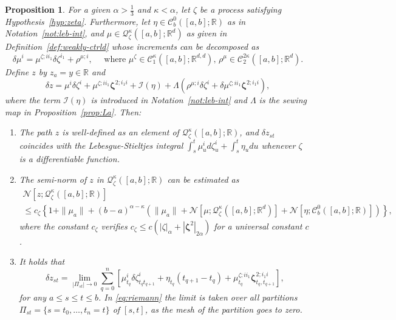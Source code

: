 \documentclass[12pt,reqno]{amsart}
\numberwithin{equation}{section}  %
\newcommand{\der}{\delta}
\newcommand{\1}{{\bf 1}}
\newcommand{\2}{{\bf 2}}
\newcommand{\R}{\mathbb R}
\newcommand{\cac}{\mathcal C}
\newcommand{\ci}{\mathcal I}
\newcommand{\cn}{\mathcal N}
\newcommand{\cq}{\mathcal Q}
\newcommand{\al}{\alpha}
\newcommand{\ka}{\kappa}
\newcommand{\laa}{\Lambda}
\newcommand{\lp}{\left(}
\newcommand{\rp}{\right)}
\newcommand{\lc}{\left[}
\newcommand{\rc}{\right]}
\newcommand{\lcl}{\left\{}
\newcommand{\rcl}{\right\}}
\newtheorem{proposition}[theorem]{Proposition}
\theoremstyle{remark}
\theoremstyle{remark}
\newcommand{\beq}{\begin{equation}}
\newcommand{\eeq}{\end{equation}}
\begin{document}
\begin{proposition}\label{prop:integral_as_weak}
For a given $\al > \frac{1}{3}$ and $\ka < \al$, let $\zeta$ be a process satisfying Hypothesis~\ref{hyp:zeta}. Furthermore, let $\eta \in \cac_b^0([a,b]; \R)$ as in Notation~\ref{not:leb-int}, and $\mu \in \cq_{\zeta}^{\ka}([a,b]; \R^d)$ as given in Definition~\ref{def:weakly-ctrld} whose increments can be decomposed as
\beq\label{b1}
\der \mu^i = \mu^{\zeta;i i_1} \der \zeta^{i_1} + \rho^{\mu;i}, \quad\text{ where } \mu^{\zeta} \in \cac_1^{\ka}([a,b]; \R^{d,d}), \, \rho^{\mu} \in \cac_2^{2\ka}([a,b]; \R^d).
\eeq
Define $z$ by $z_a = y \in \R$ and 
\beq\label{eq:b}
\der z = \mu^i\der \zeta^i + \mu^{\zeta;i i_1} \mathbf{\zeta}^{2;i_1 i} + \ci(\eta) + \Lambda(\rho^{\mu;i} \der \zeta^i + \der \mu^{\zeta;i i_1} \mathbf{\zeta}^{2; i_1 i}),
\eeq
where the term $\ci(\eta)$ is introduced in Notation~\ref{not:leb-int} and $\laa$ is the sewing map in Proposition~\ref{prop:La}. Then:
\begin{enumerate}[wide, labelwidth=!, labelindent=0pt, label=\textnormal{(\arabic*)}]
\setlength\itemsep{.05in}

\item 
 The path $z$ is well-defined as an element of $\cq_{\zeta}^{\ka}([a,b]; \R)$, and $\der z_{st}$ coincides with the Lebesgue-Stieltjes integral $\int_s^t \mu_u^i d\zeta_u^i + \int_s^t \eta_u du$  whenever $\zeta$ is a differentiable function.

\item The semi-norm of $z$ in $\cq_{\zeta}^{\ka} ([a,b]; \R)$ can be estimated as 
\begin{multline}\label{eq:6-b}
\cn[z; \cq_{\zeta}^{\ka}([a,b]; \R)] \\
\leq c_{\zeta} \lcl 1 + \|\mu_a\| + (b-a)^{\al-\ka} \lp \|\mu_a\| + \cn[\mu; \cq_{\zeta}^{\ka}([a,b]; \R^d)] + \cn[\eta; \cac_b^0([a,b]; \R)] \rp \rcl,
\end{multline}
where the constant $c_{\zeta}$ verifies $c_{\zeta} \leq c(|\zeta|_{\al} + |\mathbf{\zeta}^2|_{2\al})$ for a universal constant $c$.

\item It holds that 
\beq\label{eq:riemann}
\der z_{st} = \lim_{|\Pi_{st}| \to 0} \sum_{q=0}^n \lc \mu_{t_q}^i \der \zeta_{t_q t_{q+1}}^i + \eta_{t_q} (t_{q+1}-t_q) + \mu_{t_q}^{\zeta;i i_1} \mathbf{\zeta}_{t_q, t_{q+1}}^{2; i_1 i} \rc,
\eeq
for any $a \leq s \leq t \leq b$. In \eqref{eq:riemann} the limit is taken over all partitions $\Pi_{st} = \{s=t_0, \ldots, t_n=t\}$ of $[s,t]$, as the mesh of the partition goes to zero. 
\end{enumerate}
\end{proposition}
\end{document}
